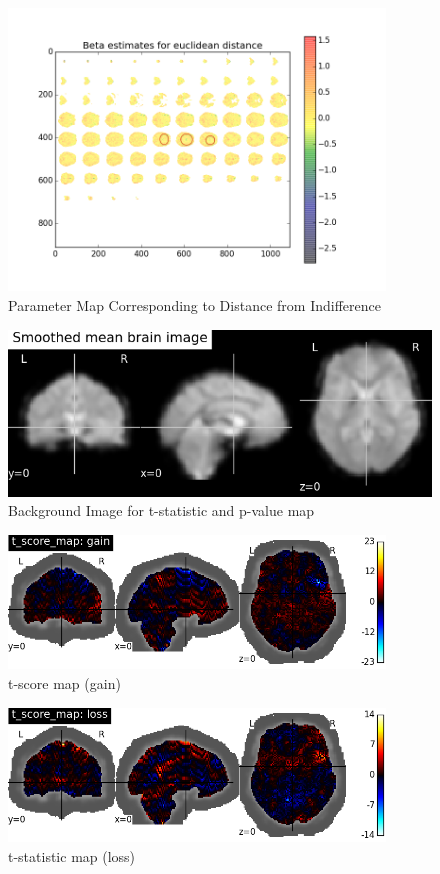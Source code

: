 \begin{figure}[h!]
\centering
\includegraphics[width=100mm]{images/parameter_map_dist.png}               
\caption{Parameter Map Corresponding to Distance from Indifference}
\label{fig:beta3}
\end{figure}

\begin{figure}[h!]
\centering
\includegraphics[width=120mm]{images/brain_template.png}               
\caption{Background Image for t-statistic and p-value map}
\label{fig:brain_temp}
\end{figure}

\begin{figure}[h!]
\centering
\includegraphics[width=100mm]{images/t_scores_gain.png}               
\caption{t-score map (gain)}
\label{fig:t_gain}
\end{figure}

\begin{figure}[h!]
\centering
\includegraphics[width=100mm]{images/t_scores_loss.png}               
\caption{t-statistic map (loss)}
\label{fig:t_loss}
\end{figure}


